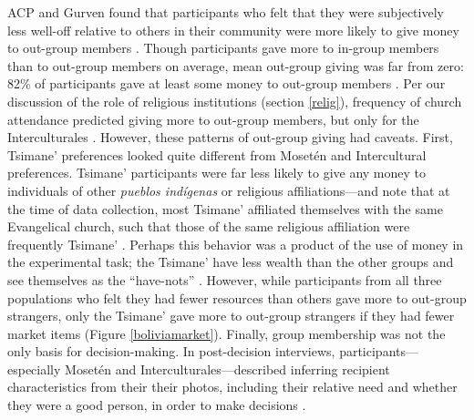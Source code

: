 \documentclass[bibauthoryear]{aa}
\begin{document}
ACP and Gurven found that participants who felt that they were subjectively less well-off relative to others in their community were more likely to give money to out-group members \citep{pisor2016risk}. Though participants gave more to in-group members than to out-group members on average, %
mean out-group giving was far from zero: 82\% of participants gave at least some money to out-group members \citep{pisor2018diversify}. %
Per our discussion of the role of religious institutions (section \ref{relig}), frequency of church attendance predicted giving more to out-group members, but only for the Interculturales \citep{pisor2016risk}. However, these patterns of out-group giving had caveats. First, Tsimane' preferences looked quite different from Moset\'en and Intercultural preferences. Tsimane' participants were far less likely to give any money to individuals of other \textit{pueblos ind\'igenas} or  religious affiliations---and note that at the time of data collection, most Tsimane' affiliated themselves with the same Evangelical church, such that those of the same religious affiliation were frequently Tsimane' \citep{pisor2018diversify}. Perhaps this behavior was a product of the use of money in the experimental task; the Tsimane' have less wealth than the other groups and see themselves as the ``have-nots''  \citep{pisor2018diversify}. However, while participants from all three populations who felt they had fewer resources than others gave more to out-group strangers, only the Tsimane' gave more to out-group strangers if they had fewer market items  (Figure \ref{boliviamarket}). Finally, group membership was not the only basis for decision-making. In post-decision interviews, participants---especially Moset\'en and Interculturales---described inferring recipient characteristics from their their photos, including their relative need and whether they were a good person, in order to make decisions \citep{pisor2018diversify, Pisor2020}.
\end{document}
